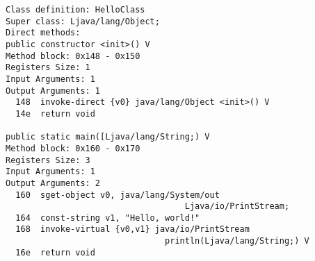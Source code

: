 \begin{lstlisting}[frame=single, numberstyle=\tiny, caption={Hello World program},label=code:hello]
Class definition: HelloClass
Super class: Ljava/lang/Object;
Direct methods:
public constructor <init>() V
Method block: 0x148 - 0x150
Registers Size: 1
Input Arguments: 1
Output Arguments: 1
  148  invoke-direct {v0} java/lang/Object <init>() V
  14e  return void

public static main([Ljava/lang/String;) V
Method block: 0x160 - 0x170
Registers Size: 3
Input Arguments: 1
Output Arguments: 2
  160  sget-object v0, java/lang/System/out
                                    Ljava/io/PrintStream;
  164  const-string v1, "Hello, world!"
  168  invoke-virtual {v0,v1} java/io/PrintStream
                                println(Ljava/lang/String;) V
  16e  return void     
\end{lstlisting}
